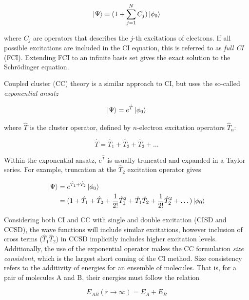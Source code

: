 \begin{doublespace}
\begin{equation}
  \ket{\Psi} = (1+\sum_{j=1}^N C_j) \ket{\phi_0}
\end{equation}

\noindent where $C_j$ are operators that describes the $j$-th excitations of
electrons. If all possible excitations are included in the CI equation, this is
referred to as \emph{full CI} (FCI). Extending FCI to an infinite basis set
gives the exact solution to the Schr{\"o}dinger equation.

Coupled cluster (CC) theory\cite{Crawford2000} is a similar approach to CI, but
uses the so-called \emph{exponential ansatz}

\begin{equation}
  \ket{\Psi} = e^{\hat{T}}\ket{\phi_0}
\end{equation}

\noindent where $\hat{T}$ is the cluster operator, defined by $n$-electron
excitation operators $\hat{T}_n$:

\begin{equation}
  \hat{T} = \hat{T}_1 + \hat{T}_2 + \hat{T}_3 + \dots
\end{equation}

Within the exponential ansatz, $e^{\hat{T}}$ is usually truncated and expanded
in a Taylor series. For example, truncation at the $\hat{T}_2$ excitation
operator gives

\begin{equation}
\begin{split}
  \ket{\Psi} &= e^{\hat{T}_1+\hat{T}_2}\ket{\phi_0} \\
  &= (1 + \hat{T}_1 + \hat{T}_2 +  \frac{1}{2!}\hat{T}_1^2 + \hat{T}_1\hat{T}_2 + \frac{1}{2!}\hat{T}_2^2 + \dots)
  \ket{\phi_0}
\end{split}
\end{equation}

\noindent Considering both CI and CC with single and double excitation (CISD
and CCSD), the wave functions will include similar excitations, however
inclusion of cross terms ($\hat{T}_1\hat{T}_2$) in CCSD implicitly includes
higher excitation levels. Additionally, the use of the exponential operator
makes the CC formulation \emph{size consistent}, which is the largest short
coming of the CI method. Size consistency refers to the additivity of energies
for an ensemble of molecules. That is, for a pair of molecules A and B, their
energies must follow the relation

\begin{equation}
  E_{AB}(r\rightarrow\infty) = E_A + E_B
\end{equation}


\end{doublespace}
